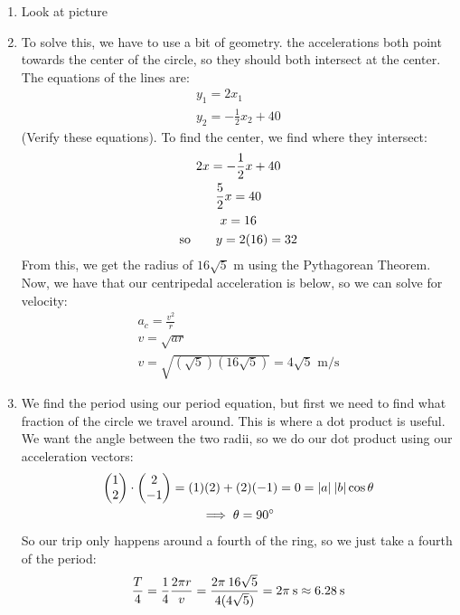 \documentclass{article}
\begin{document}
\begin{enumerate}
\item Look at picture
\item To solve this, we have to use a bit of geometry.  the accelerations both point towards the center of the circle, so they should both intersect at the center.  The equations of the lines are:
  \begin{gather*}
    y_1=2x_1 \\
    y_2 = -\frac{1}{2}x_2+40
  \end{gather*}
  (Verify these equations).  To find the center, we find where they intersect:
  \begin{gather*}
    2x = -\frac{1}{2}x+40 \\
    \frac{5}{2}x = 40 \\
    x = 16 \\
    \text{so\qquad} y = 2(16) = 32
  \end{gather*}
  From this, we get the radius of $16\sqrt{5}$ m using the Pythagorean Theorem.  Now, we have that our centripedal acceleration is below, so we can solve for velocity:
  \begin{gather*}
    a_c=\frac{v^2}{r} \\
    v=\sqrt{ar} \\
    v = \sqrt{(\sqrt{5})(16\sqrt{5})} = 4\sqrt{5} \text{ m/s}
  \end{gather*}
\item We find the period using our period equation, but first we need to find what fraction of the circle we travel around.  This is where a dot product is useful.  We want the angle between the two radii, so we do our dot product using our acceleration vectors:
  \begin{gather*}
    \begin{pmatrix}
      1\\2
    \end{pmatrix}
    \cdot
    \begin{pmatrix}
      2\\-1
    \end{pmatrix}
    = (1)(2)+(2)(-1)=0=|a|\:|b|\cos\theta \\
    \implies \theta = 90\degree
  \end{gather*}
  So our trip only happens around a fourth of the ring, so we just take a fourth of the period:
  \begin{gather*}
    \frac{T}{4} = \frac{1}{4}\frac{2\pi r}{v} = \frac{2\pi\: 16\sqrt{5}}{4(4\sqrt{5})}=2\pi\text{\:s}\approx 6.28\text{\:s}

\end{gather*}
\end{enumerate}
\end{document}
